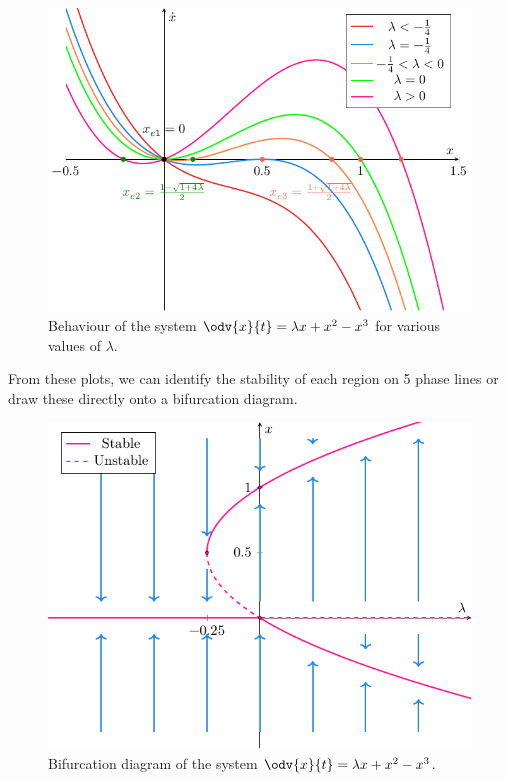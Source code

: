 \documentclass{article}
\begin{document}
\begin{figure}[H]
    \centering
    \includegraphics[width=0.8\linewidth]{figures/parametrised_phase_line.pdf}
    \caption{Behaviour of the system \(\odv{x}{t} = \lambda x + x^2 - x^3\) for various values of \(\lambda\).}
\end{figure}
From these plots, we can identify the stability of each region on 5
phase lines or draw these directly onto a bifurcation diagram.
\begin{figure}[H]
    \centering
    \includegraphics[width = 0.8\linewidth]{figures/bifurcation_diagram.pdf}
    \caption{Bifurcation diagram of the system \(\odv{x}{t} = \lambda x + x^2 - x^3\).} %
\end{figure}
\end{document}
